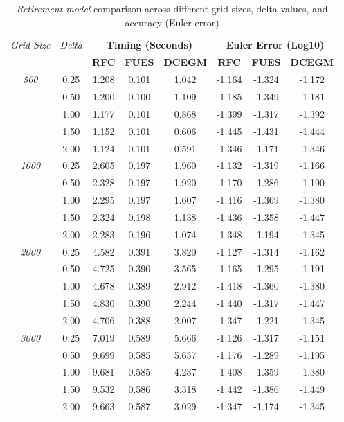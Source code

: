
\begin{table}[htbp]
\centering
\small
\begin{tabular}{ccccc|ccc}
\toprule
\multirow{2}{*}{\textit{Grid Size}} & \multirow{2}{*}{\textit{Delta}} & \multicolumn{3}{c}{\textbf{Timing (Seconds)}} & \multicolumn{3}{c}{\textbf{Euler Error (Log10)}} \\
 & & \textbf{RFC} & \textbf{FUES} & \textbf{DCEGM} & \textbf{RFC} & \textbf{FUES} & \textbf{DCEGM} \\
\midrule
\multirow{5}{*}{\textit{500}} & 0.25 & 1.208 & 0.101 & 1.042 & -1.164 & -1.324 & -1.172 \\
 & 0.50 & 1.200 & 0.100 & 1.109 & -1.185 & -1.349 & -1.181 \\
 & 1.00 & 1.177 & 0.101 & 0.868 & -1.399 & -1.317 & -1.392 \\
 & 1.50 & 1.152 & 0.101 & 0.606 & -1.445 & -1.431 & -1.444 \\
 & 2.00 & 1.124 & 0.101 & 0.591 & -1.346 & -1.171 & -1.346 \\
\midrule
\multirow{5}{*}{\textit{1000}} & 0.25 & 2.605 & 0.197 & 1.960 & -1.132 & -1.319 & -1.166 \\
 & 0.50 & 2.328 & 0.197 & 1.920 & -1.170 & -1.286 & -1.190 \\
 & 1.00 & 2.295 & 0.197 & 1.607 & -1.416 & -1.369 & -1.380 \\
 & 1.50 & 2.324 & 0.198 & 1.138 & -1.436 & -1.358 & -1.447 \\
 & 2.00 & 2.283 & 0.196 & 1.074 & -1.348 & -1.194 & -1.345 \\
\midrule
\multirow{5}{*}{\textit{2000}} & 0.25 & 4.582 & 0.391 & 3.820 & -1.127 & -1.314 & -1.162 \\
 & 0.50 & 4.725 & 0.390 & 3.565 & -1.165 & -1.295 & -1.191 \\
 & 1.00 & 4.678 & 0.389 & 2.912 & -1.418 & -1.360 & -1.380 \\
 & 1.50 & 4.830 & 0.390 & 2.244 & -1.440 & -1.317 & -1.447 \\
 & 2.00 & 4.706 & 0.388 & 2.007 & -1.347 & -1.221 & -1.345 \\
\midrule
\multirow{5}{*}{\textit{3000}} & 0.25 & 7.019 & 0.589 & 5.666 & -1.126 & -1.317 & -1.151 \\
 & 0.50 & 9.699 & 0.585 & 5.657 & -1.176 & -1.289 & -1.195 \\
 & 1.00 & 9.681 & 0.585 & 4.237 & -1.408 & -1.359 & -1.380 \\
 & 1.50 & 9.532 & 0.586 & 3.318 & -1.442 & -1.386 & -1.449 \\
 & 2.00 & 9.663 & 0.587 & 3.029 & -1.347 & -1.174 & -1.345 \\
\midrule

\bottomrule
\end{tabular}
\caption{\textit{Retirement model} comparison across different grid sizes, delta values, and accuracy (Euler error)}
\label{tab:timing_comparison}
\end{table}
